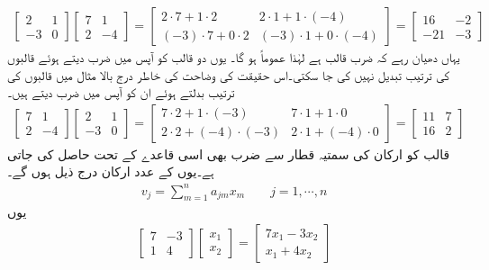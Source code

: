 \begin{align*}
\begin{bmatrix}
2 & 1\\
-3 & 0
\end{bmatrix}
\begin{bmatrix}
7 &1\\
2&-4
\end{bmatrix}=
\begin{bmatrix}
2\cdot 7+1\cdot 2& 2 \cdot 1+1\cdot(-4)\\
(-3)\cdot 7+0\cdot 2& (-3)\cdot 1+0\cdot(-4)
\end{bmatrix}=
\begin{bmatrix}
16&-2\\
-21&-3
\end{bmatrix}
\end{align*}
یہاں دھیان رہے  کہ ضرب قالب  ہے لہٰذا  عموماً  ہو گا۔ یوں دو قالب کو آپس میں ضرب دیتے ہوئے  قالبوں کی ترتیب تبدیل نہیں کی جا سکتی۔اس حقیقت کی وضاحت کی خاطر درج بالا مثال میں قالبوں کی ترتیب بدلتے ہوئے ان کو آپس میں ضرب  دیتے ہیں۔
\begin{align*}
\begin{bmatrix}
7 & 1\\
2 & -4
\end{bmatrix}
\begin{bmatrix}
2&1\\
-3&0
\end{bmatrix}=
\begin{bmatrix}
7\cdot 2+1\cdot(-3)& 7\cdot 1+1\cdot 0\\
2\cdot 2+(-4)\cdot (-3)& 2\cdot 1 +(-4)\cdot 0
\end{bmatrix}=
\begin{bmatrix}
11& 7\\
16 &2
\end{bmatrix}
\end{align*}
 قالب  کو  ارکان کی سمتیہ قطار  سے ضرب بھی اسی قاعدے کے تحت حاصل کی جاتی ہے۔یوں  کے  عدد ارکان درج ذیل ہوں گے۔
\begin{align}
v_j=\sum_{m=1}^{n} a_{jm}x_{m} \quad \quad j=1,\cdots, n
\end{align}
یوں
\begin{align*}
\begin{bmatrix}
7 & -3\\
1 & 4
\end{bmatrix}
\begin{bmatrix}
x_1\\
x_2
\end{bmatrix}=
\begin{bmatrix}
7x_1-3x_2\\
x_1+4x_2
\end{bmatrix}
\end{align*}
